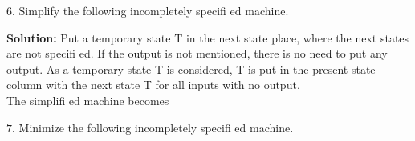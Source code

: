 \documentclass[12pt,a4paper]{book}
\begin{document}
$6.$ Simplify the following incompletely specifi ed machine.
\begin{center}
\begin{table}[h]
\centering
{}
\end{table}
\end{center}
\textbf{Solution:}  Put a temporary state T in the next state place, where the next states are not specifi ed.
If the output is not mentioned, there is no need to put any output.
\newpage
As a temporary state T is considered, T is put in the present state column with the next state T for all inputs with no output.\\
The simplifi ed machine becomes\\
\begin{center}
\begin{table}[h]
\centering
{}
\end{table}
\end{center}
$7.$ Minimize the following incompletely specifi ed machine.\\
\begin{center}
\begin{table}[h]
\centering
{}
\end{table}
\end{center}
\end{document}
